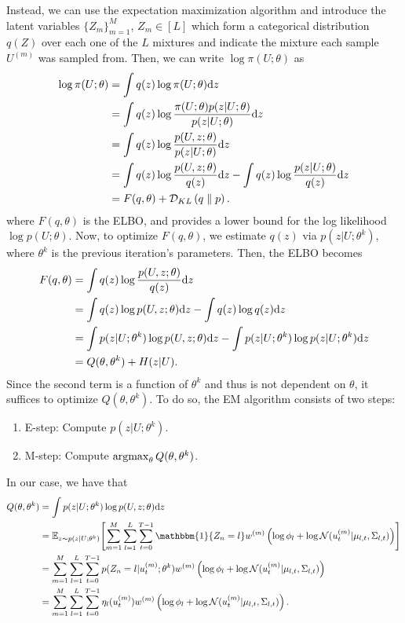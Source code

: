 \documentclass[twoside,11pt]{article}
\begin{document}
Instead, we can use the expectation maximization algorithm and introduce the latent variables $\{ Z_m \}_{m=1}^M$, $Z_m \in [L]$ which form a categorical distribution $q(Z)$ over each one of the $L$ mixtures and indicate the mixture each sample $U^{(m)}$ was sampled from.
Then, we can write $\log \pi(U; \theta)$ as
\begin{align}
    \log \pi(U; \theta) &= \int q(z) \log \pi(U; \theta) {\mathrm d} z \\
    &= \int q(z) \log \frac{ \pi(U; \theta)p(z|U; \theta) }{p(z | U; \theta)} {\mathrm d} z \\
    &= \int q(z) \log \frac{ p(U, z; \theta)}{p(z | U; \theta)} {\mathrm d} z \\
    &= \int q(z) \log \frac{ p(U, z; \theta)}{q(z)} {\mathrm d} z - \int q(z) \log \frac{p(z|U; \theta)}{q(z)} {\mathrm d} z \\
    &= F(q, \theta) + \mathcal{D}_{KL}\left({q}\parallel {p}\right) .
\end{align}
where $F(q, \theta)$ is the ELBO, and provides a lower bound for the log likelihood $\log p(U; \theta)$.
Now, to optimize $F(q, \theta)$, we estimate $q(z)$ via $p(z | U; \theta^{k})$, where $\theta^{k}$ is the previous iteration's parameters.
Then, the ELBO becomes
\begin{align}
    F(q, \theta)
    &= \int q(z) \log \frac{p(U, z; \theta)}{q(z)} {\mathrm d} z \\
    &= \int q(z) \log p(U, z; \theta) {\mathrm d} z - \int q(z) \log q(z) {\mathrm d} z \\
    &= \int p(z | U; \theta^{k}) \log p(U, z; \theta) {\mathrm d} z - \int p(z | U; \theta^k) \log p(z | U; \theta^k) {\mathrm d} z \\
    &= Q(\theta, \theta^k) + H(z | U) .
\end{align}
Since the second term is a function of $\theta^k$ and thus is not dependent on $\theta$, it suffices to optimize $Q(\theta, \theta^k)$.
To do so, the EM algorithm consists of two steps:
\begin{enumerate}
    \item E-step: Compute $p(z | U; \theta^k)$.
    \item M-step: Compute $\argmax_\theta Q(\theta, \theta^k)$.
\end{enumerate}
In our case, we have that
\begin{align}
    Q(\theta, \theta^k)
    &= \int p(z | U; \theta^{k}) \log p(U, z; \theta) \rd z \\
    &= \ExP{z \sim p(z | U; \theta^k) }{ \sum_{m=1}^M \sum_{l=1}^L \sum_{t=0}^{T-1} \mathbbm{1}\{Z_n = l\} w^{(m)} \left( \log \phi_l + \log \mathcal{N}(u_t^{(m)} | \mu_{l, t}, \Sigma_{l, t}) \right) } \\
    &= \sum_{m=1}^M \sum_{l=1}^L \sum_{t=0}^{T-1} p(Z_n = l | u_t^{(m)}; \theta^k) w^{(m)} \left( \log \phi_l + \log \mathcal{N}(u_t^{(m)} | \mu_{l, t}, \Sigma_{l, t}) \right) \\
    &= \sum_{m=1}^M \sum_{l=1}^L \sum_{t=0}^{T-1} \eta_l(u_t^{(m)}) w^{(m)} \left( \log \phi_l + \log \mathcal{N}(u_t^{(m)} | \mu_{l, t}, \Sigma_{l, t}) \right).
\end{align}
\end{document}
